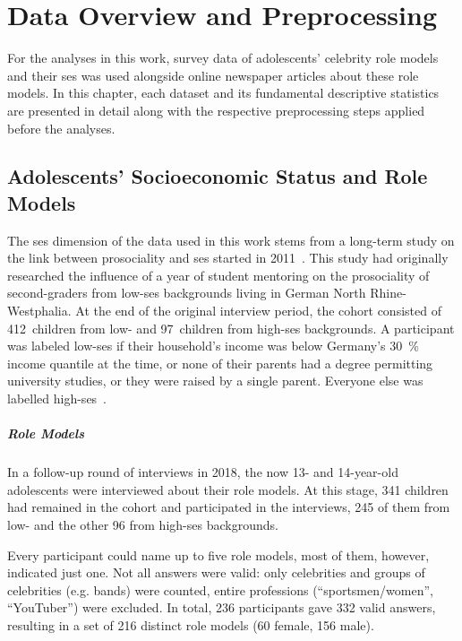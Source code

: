 \renewcommand{\imagepath}{../30-data/img}

\chapter{Data Overview and Preprocessing}\label{ch:data}
For the analyses in this work, survey data of adolescents' celebrity role models and their \gls{ses} was used alongside online newspaper articles about these role models. In this chapter, each dataset and its fundamental descriptive statistics are presented in detail along with the respective preprocessing steps applied before the analyses.

\section{Adolescents' Socioeconomic Status and Role Models}
The \gls{ses} dimension of the data used in this work stems from a long-term study on the link between prosociality and \gls{ses} started in 2011~\autocite{kosse_formation_2020}. This study had originally researched the influence of a year of student mentoring on the prosociality of second-graders from low-\gls{ses} backgrounds living in German North Rhine-Westphalia. At the end of the original interview period, the cohort consisted of \SI{412}{children} from low- and \SI{97}{children} from high-\gls{ses} backgrounds. A participant was labeled low-\gls{ses} if their household's income was below Germany's \SI{30}{\percent} income quantile at the time, or none of their parents had a degree permitting university studies, or they were raised by a single parent. Everyone else was labelled high-\gls{ses}~\autocite{kosse_formation_2020}.

\paragraph{Role Models}
In a follow-up round of interviews in 2018, the now 13- and 14-year-old adolescents were interviewed about their role models. At this stage, \SI{341}{} children had remained in the cohort and participated in the interviews, \SI{245}{} of them from low- and the other \SI{96}{} from high-\gls{ses} backgrounds.

Every participant could name up to five role models, most of them, however, indicated just one. Not all answers were valid: only celebrities and groups of celebrities (e.g. bands) were counted, entire professions (``sportsmen/women'', ``YouTuber'') were excluded. In total, \SI{236}{} participants gave \SI{332}{} valid answers, resulting in a set of \SI{216}{} distinct role models (\SI{60}{} female, \SI{156}{} male).

